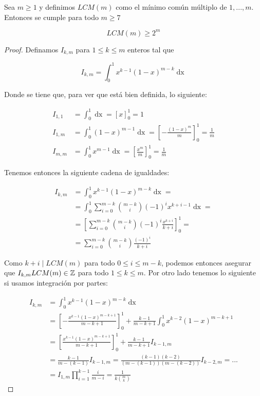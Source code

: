 \begin{lema}\label{desigualdad_LCM}
	Sea $m \geq 1$ y definimos $LCM(m)$ como el mínimo común múltiplo de $1,...,m$. Entonces se cumple para todo $m \geq 7$
	
	\begin{equation}
		LCM(m) \geq 2^m
	\end{equation}
\end{lema}

\begin{proof}
	Definamos $I_{k,m}$ para $1 \leq k \leq m$ enteros tal que
	
	\begin{equation}
	I_{k,m} = \int_{0}^{1}x^{k-1}(1-x)^{m-k}\mathop{dx}
	\end{equation}
	
	Donde se tiene que, para ver que está bien definida, lo siguiente:
	
	\begin{align}
	I_{1,1} &= \int_{0}^{1}\mathop{dx} = \left[x\right]_0^1 = 1\\
	I_{1,m} &= \int_{0}^{1}(1-x)^{m-1}\mathop{dx} = \left[-\frac{(1-x)^m}{m}\right]_0^1 = \frac{1}{m}\\
	I_{m,m} &= \int_{0}^{1}x^{m-1}\mathop{dx} = \left[\frac{x^m}{m}\right]_0^1 = \frac{1}{m}
	\end{align}
	
	Tenemos entonces la siguiente cadena de igualdades:
	
	\begin{align}
	I_{k,m} &= \int_{0}^{1}x^{k-1}(1-x)^{m-k}\mathop{dx} =\\
	&= \int_{0}^{1}\sum_{i=0}^{m-k}\binom{m-k}{i}(-1)^ix^{k+i-1}\mathop{dx} =\\
	&= \left[\sum_{i=0}^{m-k}\binom{m-k}{i}(-1)^i\frac{x^{k+i}}{k+i}\right]_0^1 =\\
	&= \sum_{i=0}^{m-k}\binom{m-k}{i}\frac{(-1)^i}{k+i}
	\end{align}
	
	Como $k+i \mid LCM(m)$ para todo $0 \leq i \leq m-k$, podemos entonces asegurar que $I_{k,m}LCM(m) \in \mathbb{Z}$ para todo $1 \leq k \leq m$. Por otro lado tenemos lo siguiente si usamos integración por partes:
	
	\begin{align}
	I_{k,m} &= \int_{0}^{1}x^{k-1}(1-x)^{m-k}\mathop{dx}\\
	&= \left[-\frac{x^{k-1}(1-x)^{m-k+1}}{m-k+1}\right]_0^1 + \frac{k-1}{m-k+1}\int_{0}^{1}x^{k-2}(1-x)^{m-k+1}\\
	&= \left[\frac{x^{k-1}(1-x)^{m-k+1}}{m-k+1}\right]_0^1 + \frac{k-1}{m-k+1}I_{k-1,m}\\
	&= \frac{k-1}{m-(k-1)}I_{k-1,m} = \frac{(k-1)(k-2)}{(m-(k-1))(m-(k-2))}I_{k-2,m} =...\\
	&= I_{1,m}\prod_{i=1}^{k-1}\frac{i}{m-i} = \frac{1}{k\displaystyle\binom{m}{k}}
	\end{align}
	

\end{proof}
